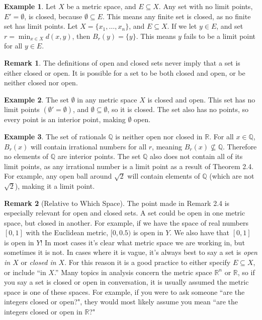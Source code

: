 \documentclass{article}
\newcommand{\R}{\mathbb{R}}
\newcommand{\Q}{\mathbb{Q}}
\theoremstyle{definition}
\newtheorem{example}{Example}[section]
\newtheorem{remark}{Remark}[section]
\begin{document}
	\begin{example}
		Let $ X $ be a metric space, and $ E\subseteq X $. Any set with no limit points, $ E'=\emptyset $, is closed, because $ \emptyset\subseteq E $. This means any finite set is closed, as no finite set has limit points. Let $ X=\{x_1,\ldots, x_n\} $, and $ E\subseteq X $. If we let $ y\in E $, and set $ r=\min_{x\in X}d(x,y) $, then $ B_r(y)=\{y\} $. This means $ y $ fails to be a limit point for all $ y\in E $.
	\end{example}
	\begin{remark}
		The definitions of open and closed sets never imply that a set is either closed or open. It is possible for a set to be both closed and open, or be neither closed nor open.
	\end{remark}
	\begin{example}
		The set $ \emptyset $ in any metric space $ X $ is closed and open. This set has no limit points $ (\emptyset'=\emptyset) $, and $ \emptyset\subseteq\emptyset $, so it is closed. The set also has no points, so every point is an interior point, making $ \emptyset $ open. 
	\end{example}
	\begin{example}
		The set of rationals $ \Q $ is neither open nor closed in $ \R $. For all $ x\in\Q $, $ B_r(x) $ will contain irrational numbers for all $ r $, meaning $ B_r(x)\not\subseteq\Q $. Therefore no elements of $ \Q $ are interior points. The set $ \Q $ also does not contain all of its limit points, as any irrational number is a limit point as a result of Theorem 2.4. For example, any open ball around $ \sqrt{2} $ will contain elements of $ \Q $ (which are not $ \sqrt{2} $), making it a limit point. 
	\end{example}
	\begin{remark}[Relative to Which Space]
		The point made in Remark 2.4 is especially relevant for open and closed sets. A set could be open in one metric space, but closed in another. For example, if we have the space of real numbers $ [0,1] $ with the Euclidean metric, $ [0,0.5) $ is open in $ Y $. We also have that $ [0,1] $ is open in $ Y $! In most cases it's clear what metric space we are working in, but sometimes it is not. In cases where it is vague, it's always best to say a set is \textit{open in $ X $} or \textit{closed in $ X $}. For this reason it is a good practice to either specify $ E\subseteq X $, or include ``in $ X $.'' Many topics in analysis concern the metric space $ \R^n $ or $ \R $, so if you say a set is closed or open in conversation, it is usually assumed the metric space is one of these spaces. For example, if you were to ask someone ``are the integers closed or open?", they would most likely assume you mean ``are the integers closed or open in $ \R $?" 
	\end{remark}
	
\end{document}
